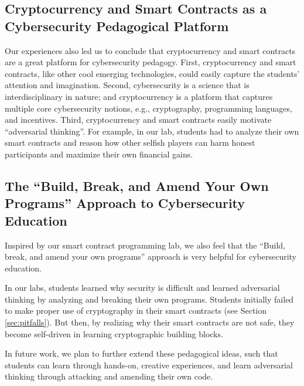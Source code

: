 \documentclass{llncs}
\newcommand{\ignore}[1]{}
\begin{document}
\subsection{Cryptocurrency and Smart Contracts as 
a Cybersecurity Pedagogical Platform}
Our experiences also led us to conclude 
that cryptocurrency and smart contracts are a
great platform for cybersecurity pedagogy. 
First, cryptocurrency and smart contracts, like
other cool emerging technologies, could easily capture the students'
attention and imagination.
Second, 
cybersecurity is a science that is interdisciplinary in nature;
and cryptocurrency is a platform that captures 
multiple core cybersecurity notions, e.g., cryptography, 
programming languages, and incentives. 
Third, cryptocurrency and smart contracts
easily motivate ``adversarial thinking''. For example,
in our lab, students had to analyze their own smart contracts
and reason how other selfish players can harm 
honest participants and maximize their own financial gains.

\ignore{
in our lab, students were able to compose smart contracts,
and then conduct in-depth security analyses of their own smart contracts.
In this process, students learned the 
essence of ``adversarial thinking'', e.g., by reasoning how
selfish participants in a smart contract 
can maximize its financial gains and harm honest players. 
}


\subsection{The ``Build, Break, and Amend Your Own Programs''
Approach to Cybersecurity Education}
Inspired by our smart contract programming lab, 
we also feel that the 
``Build, break, and amend your own programs'' approach
is very helpful for cybersecurity education. 

In our labs, students learned why security is difficult 
and learned adversarial thinking
by analyzing and breaking 
their own programs.  
Students initially  
failed to make proper use of cryptography in their 
smart contracts (see Section \ref{sec:pitfalls}).
But then, by realizing
why their smart contracts are not safe, they 
become self-driven in learning cryptographic building blocks.

In future work, we plan to further extend these pedagogical ideas, 
such that students can learn through hands-on, 
creative experiences, and learn adversarial thinking 
through attacking and amending their own code.
\end{document}
